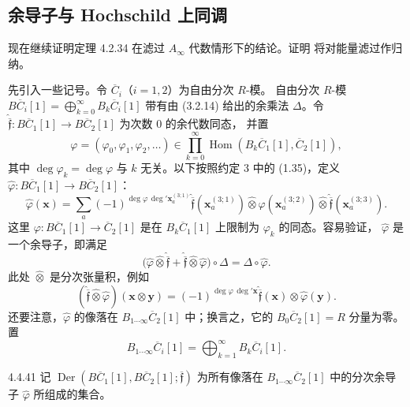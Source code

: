
\subsection{余导子与 Hochschild 上同调}
\label{subsec:4-4-5}

现在继续证明定理 4.2.34 在滤过 $A_\infty$ 代数情形下的结论。证明
将对能量滤过作归纳。

先引入一些记号。令 $\overline C_i$（$i=1,2$）为自由分次 $R$-模。
自由分次 $R$-模
$B\overline C_i[1]=\bigoplus_{k=0}^{\infty}B_k\overline C_i[1]$
带有由 (3.2.14) 给出的余乘法 $\Delta$。令
$\widehat{\overline{\mathfrak f}}\colon
B\overline C_1[1]\to B\overline C_2[1]$ 为次数 $0$ 的余代数同态，
并置
\[
 \varphi=(\varphi_0,\varphi_1,\varphi_2,\ldots)
 \in\prod_{k=0}^{\infty}
 \operatorname{Hom}(B_k\overline C_1[1],\overline C_2[1]),
\]
其中 $\deg\varphi_k=\deg\varphi$ 与 $k$ 无关。以下按照约定 3
中的 (1.35)，定义
$\widehat\varphi\colon B\overline C_1[1]\to B\overline C_2[1]$：
\begin{equation}
 \widehat\varphi(\mathbf x)
 =\sum_a(-1)^{\deg\varphi\,\deg'\mathbf x_a^{(3;1)}}
 \widehat{\overline{\mathfrak f}}(\mathbf x_a^{(3;1)})
 \widehat\otimes\varphi(\mathbf x_a^{(3;2)})
 \widehat\otimes
 \widehat{\overline{\mathfrak f}}(\mathbf x_a^{(3;3)}).
\tag{4.4.39}\label{eq:4-4-39}
\end{equation}
这里 $\varphi\colon B\overline C_1[1]\to\overline C_2[1]$ 是在
$B_k\overline C_1[1]$ 上限制为 $\varphi_k$ 的同态。容易验证，
$\widehat\varphi$ 是一个余导子，即满足
\begin{equation}
 \bigl(\widehat\varphi\widehat\otimes
 \widehat{\overline{\mathfrak f}}+
 \widehat{\overline{\mathfrak f}}\widehat\otimes
 \widehat\varphi\bigr)\circ\Delta
 =\Delta\circ\widehat\varphi.
\tag{4.4.40}\label{eq:4-4-40}
\end{equation}
此处 $\widehat\otimes$ 是分次张量积，例如
\[
 (\widehat{\overline{\mathfrak f}}\widehat\otimes
 \widehat\varphi)(\mathbf x\otimes\mathbf y)
 =(-1)^{\deg\varphi\,\deg'\mathbf x}
 \widehat{\overline{\mathfrak f}}(\mathbf x)
 \otimes\widehat\varphi(\mathbf y).
\]
还要注意，$\widehat\varphi$ 的像落在
$B_{1\cdots\infty}\overline C_2[1]$ 中；换言之，它的
$B_0\overline C_2[1]=R$ 分量为零。置
\[
 B_{1\cdots\infty}\overline C_i[1]
 =\bigoplus_{k=1}^{\infty}B_k\overline C_i[1].
\]

\begin{definition}{4.4.41}\label{def:4-4-41}
记
$\operatorname{Der}(B\overline C_1[1],B\overline C_2[1];
\overline{\mathfrak f})$
为所有像落在 $B_{1\cdots\infty}\overline C_2[1]$ 中的分次余导子
$\widehat\varphi$ 所组成的集合。
\end{definition}

